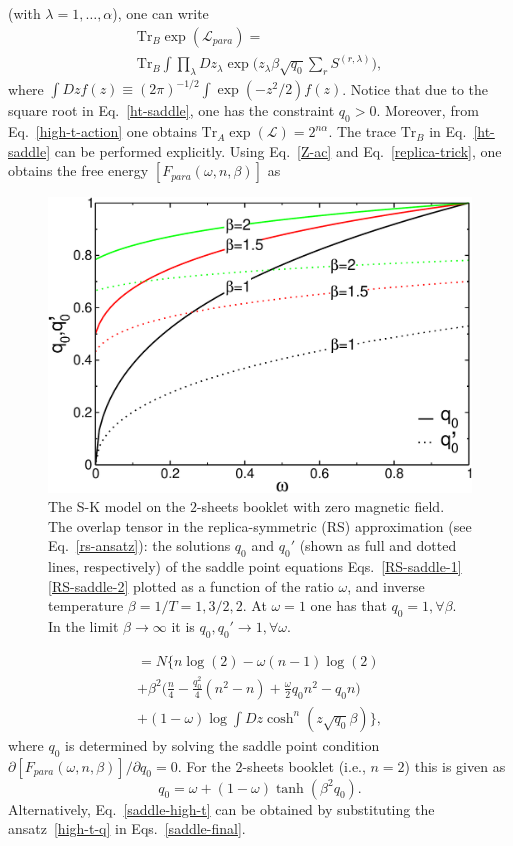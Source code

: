 \documentclass[twocolumn,superscriptaddress,prb,10pt]{revtex4-1}
\def\tr{\textrm{Tr}}
\begin{document}
(with $\lambda=1,\dots,\alpha$), one can write 
%
\begin{multline}
\label{ht-saddle}
\textrm{Tr}_B\exp({\mathcal L}_{para})=\\\tr_B\int\prod_\lambda Dz_{\lambda}
\exp\Big(z_\lambda\beta\sqrt{q_0}\sum_r S^{(r,\lambda)}\Big),
\end{multline}
%
where $\int Dz f(z)\equiv(2\pi)^{-1/2}\int\exp(-z^2/2)f(z)$. Notice that 
due to the square root in Eq.~\eqref{ht-saddle}, one has the constraint 
$q_0>0$. Moreover, from Eq.~\eqref{high-t-action} 
one obtains $\textrm{Tr}_A\exp({\mathcal L})=2^{n\alpha}$. The trace 
$\textrm{Tr}_B$ in Eq.~\eqref{ht-saddle} can be performed explicitly. 
Using Eq.~\eqref{Z-ac} and Eq.~\eqref{replica-trick}, one obtains 
the free energy $[F_{para}(\omega,n,\beta)]$ as  
%
\begin{figure}[t]
\includegraphics*[width=0.9\linewidth]{./draft_figs/RSB0_saddle}
\caption{\label{RSB0-saddle}
 The S-K model on the $2$-sheets booklet with zero magnetic field. The 
 overlap tensor in the replica-symmetric (RS) approximation (see Eq.~\eqref{rs-ansatz}): 
 the solutions $q_0$ and $q_0'$ (shown as full and dotted lines, respectively) 
 of the saddle point equations Eqs.~\eqref{RS-saddle-1}\eqref{RS-saddle-2} 
 plotted as a function of the ratio $\omega$, and inverse temperature 
 $\beta=1/T=1,3/2,2$. At $\omega=1$ one has that $q_0=1,\forall\beta$.
 In the limit $\beta\to\infty$ it is $q_0,q_0'\to 1,\forall\omega$.
}
\label{RSB0_saddle}
\end{figure}
%
\begin{multline}
[F_{para}(\omega,n,\beta)]=N\Big\{
n\log(2)-\omega(n-1)\log(2)\\+
\beta^2\Big(\frac{n}{4}-\frac{q_0^2}{4}(n^2-n)
+\frac{\omega}{2}q_0n^2-q_0n\Big)\\
+(1-\omega)\log\int Dz\cosh^n(z\sqrt{q_0}\beta)
\Big\},
\label{ht-logZ}
\end{multline}
%
where $q_0$ is determined by solving the saddle point condition $\partial[F_{para}
(\omega,n,\beta)]/\partial q_0=0$. For the $2$-sheets booklet (i.e., $n=2$) this is  
given as   
%
\begin{equation}
q_0=\omega+(1-\omega)\tanh(\beta^2 q_0).
\label{saddle-high-t}
\end{equation}
%
Alternatively, Eq.~\eqref{saddle-high-t} can be obtained by substituting the 
ansatz~\eqref{high-t-q} in Eqs.~\eqref{saddle-final}. 
\end{document}
